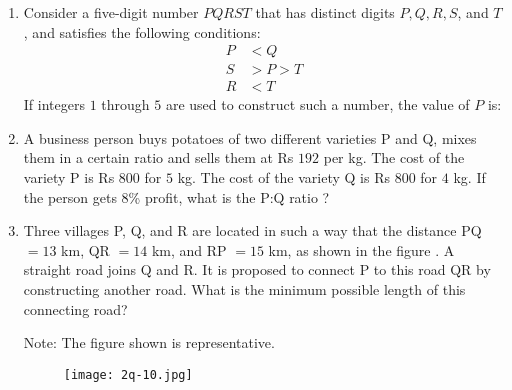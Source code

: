 \documentclass[journal,12pt,onecolumn]{article}
\theoremstyle{remark}
\begin{document}
\begin{enumerate}
    \item Consider a five-digit number $PQRST$ that has distinct digits $P, Q, R, S$, and $T$, and satisfies the following conditions:
    \begin{align*}
        P &< Q \\
        S &> P > T \\
        R &< T
    \end{align*}
    If integers $1$ through $5$ are used to construct such a number, the value of $P$ is:
    
    \hfill{}
    \begin{enumerate}
    \end{enumerate}

    \item A business person buys potatoes of two different varieties P and Q, mixes them in a certain ratio and sells them at Rs $192$ per kg.
    The cost of the variety P is Rs $800$ for $5$ kg.
    The cost of the variety Q is Rs $800$ for $4$ kg.
    If the person gets $8$\% profit, what is the P:Q ratio ?
    
    \hfill{}
    \begin{enumerate}
    \end{enumerate}

    \item Three villages P, Q, and R are located in such a way that the distance PQ $= 13$ km, QR $= 14$ km, and RP $= 15$ km, as shown in the figure . A straight road joins Q and R. It is proposed to connect P to this road QR by constructing another road. What is the minimum possible length  of this connecting road?
    
    Note: The figure shown is representative.
    \begin{figure}[H]
        \centering
        \texttt{[image: 2q-10.jpg]}
        \caption{}
        \label{fig:q10}
    \end{figure}


\end{enumerate}
\end{document}
